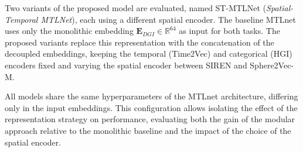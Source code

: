 Two variants of the proposed model are evaluated, named ST-MTLNet (\textit{Spatial-Temporal MTLNet}), each using a different spatial encoder. The baseline MTLnet \cite{silva2025mtlnet} uses only the monolithic embedding $\mathbf{E}_{DGI} \in \mathbb{R}^{64}$ as input for both tasks. The proposed variants replace this representation with the concatenation of the decoupled embeddings, keeping the temporal (Time2Vec) and categorical (HGI) encoders fixed and varying the spatial encoder between SIREN and Sphere2Vec-M.

All models share the same hyperparameters of the MTLnet architecture, differing only in the input embeddings. This configuration allows isolating the effect of the representation strategy on performance, evaluating both the gain of the modular approach relative to the monolithic baseline and the impact of the choice of the spatial encoder.
